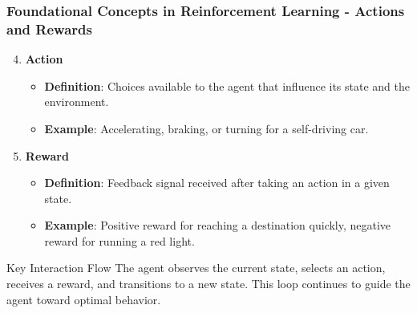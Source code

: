\documentclass[aspectratio=169]{beamer}
\begin{document}
\begin{frame}[fragile]
    \frametitle{Foundational Concepts in Reinforcement Learning - Actions and Rewards}
    \begin{enumerate}
        \setcounter{enumi}{3} %
        \item \textbf{Action}
        \begin{itemize}
            \item \textbf{Definition}: Choices available to the agent that influence its state and the environment.
            \item \textbf{Example}: Accelerating, braking, or turning for a self-driving car.
        \end{itemize}
        
        \item \textbf{Reward}
        \begin{itemize}
            \item \textbf{Definition}: Feedback signal received after taking an action in a given state.
            \item \textbf{Example}: Positive reward for reaching a destination quickly, negative reward for running a red light.
        \end{itemize}
    \end{enumerate}

    \begin{block}{Key Interaction Flow}
        The agent observes the current state, selects an action, receives a reward, and transitions to a new state. This loop continues to guide the agent toward optimal behavior.
    \end{block}
\end{frame}
\end{document}
